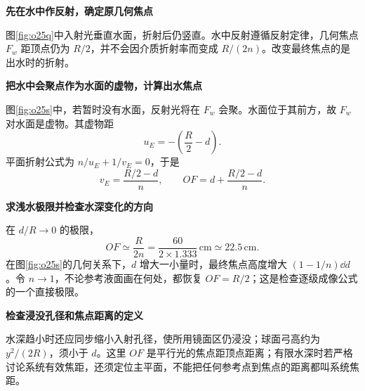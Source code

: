 \begin{solution}\textbf{先在水中作反射，确定原几何焦点}\par\nobreak
图\ref{fig:o25q}中入射光垂直水面，折射后仍竖直。水中反射遵循反射定律，几何焦点 \(F_w\) 距顶点仍为 \(R/2\)，并不会因介质折射率而变成 \(R/(2n)\)。改变最终焦点的是出水时的折射。



\par\medskip{}\noindent\textbf{把水中会聚点作为水面的虚物，计算出水焦点}\par\nobreak
图\ref{fig:o25s}中，若暂时没有水面，反射光将在 \(F_w\) 会聚。水面位于其前方，故 \(F_w\) 对水面是虚物。其虚物距
\[
 u_E=-\left(\frac R2-d\right).
\]
平面折射公式为 \(n/u_E+1/v_E=0\)，于是
\[
 v_E=\frac{R/2-d}{n},\qquad
 \boxed{OF=d+\frac{R/2-d}{n}}.
\]



\par\medskip{}\noindent\textbf{求浅水极限并检查水深变化的方向}\par\nobreak
在 \(d/R\to0\) 的极限，
\[
 \boxed{OF\simeq\frac{R}{2n}
 =\frac{60}{2\times1.333}\,\mathrm{cm}\simeq22.5\,\mathrm{cm}}.
\]
在图\ref{fig:o25s}的几何关系下，\(d\) 增大一小量时，最终焦点高度增大 \((1-1/n)\dd d\)。令 \(n\to1\)，不论参考液面画在何处，都恢复 \(OF=R/2\)；这是检查逐级成像公式的一个直接极限。


\par\medskip{}\noindent\textbf{检查浸没孔径和焦点距离的定义}\par\nobreak
水深趋小时还应同步缩小入射孔径，使所用镜面区仍浸没；球面弓高约为 $y^2/(2R)$，须小于 $d$。这里 \(OF\) 是平行光的焦点距顶点距离；有限水深时若严格讨论系统有效焦距，还须定位主平面，不能把任何参考点到焦点的距离都叫系统焦距。
\end{solution}

